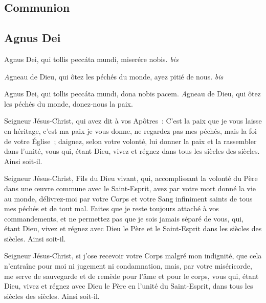 \begin{multicols}{2}

\subsection*{Communion}
\subsection*{%
Agnus Dei%
}


Agnus Dei, qui tollis peccáta mundi, miserére nobis. \emph{bis}%

{\textit Agneau de Dieu, qui ôtez les péchés du monde, ayez pitié de nous. \emph{bis}%
}%

{%
Agnus Dei, qui tollis peccáta mundi, dona nobis pacem.%
}{%
\textit Agneau de Dieu, qui ôtez les péchés du monde, donez-nous la paix.%
}%

Seigneur Jésus-Christ, qui avez dit à vos Apôtres~: C'est la paix que je vous laisse en héritage, c'est ma paix je vous donne, ne regardez pas mes péchés, mais la foi de votre Église~; daignez, selon votre volonté, lui donner la paix et la rassembler dans l'unité, vous qui, étant Dieu, vivez et régnez dans tous les siècles des siècles. Ainsi soit-il.


Seigneur Jésus-Christ, Fils du Dieu vivant, qui, accomplissant la volonté du Père dans une œuvre commune avec le Saint-Esprit, avez par votre mort donné la vie au monde, délivrez-moi par votre Corps et votre Sang infiniment saints de tous mes péchés et de tout mal. Faites que je reste toujours attaché à vos commandements, et ne permettez pas que je sois jamais séparé de vous, qui, étant Dieu, vivez et régnez avec Dieu le Père et le Saint-Esprit dans les siècles des siècles. Ainsi soit-il.

Seigneur Jésus-Christ, si j'ose recevoir votre Corps malgré mon indignité, que cela n'entraîne pour moi ni jugement ni condamnation, mais, par votre miséricorde, me serve de sauvegarde et de remède pour l'âme et pour le corps, vous qui, étant Dieu, vivez et régnez avec Dieu le Père en l'unité du Saint-Esprit, dans tous les siècles des siècles. Ainsi soit-il.
\end{multicols}

